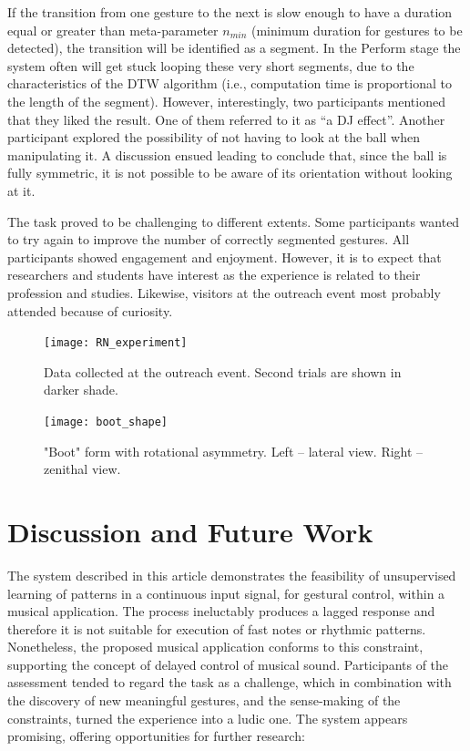 \documentclass{nime-alternate_ADJ} %
\begin{document}
If the transition from one gesture to the next is slow enough to have a duration equal or greater than meta-parameter $n_{min}$ (minimum duration for gestures to be detected), the transition will be identified as a segment. In the Perform stage the system often will get stuck looping these very short segments, due to the characteristics of the DTW algorithm (i.e., computation time is proportional to the length of the segment). However, interestingly, two participants mentioned that they liked the result. One of them referred to it as “a DJ effect”. Another participant explored the possibility of not having to look at the ball when manipulating it. A discussion ensued leading to conclude that, since the ball is fully symmetric, it is not possible to be aware of its orientation without looking at it.

The task proved to be challenging to different extents. Some participants wanted to try again to improve the number of correctly segmented gestures. All participants showed engagement and enjoyment. However, it is to expect that researchers and students have interest as the experience is related to their profession and studies. Likewise, visitors at the outreach event most probably attended because of curiosity.

\begin{figure}[t!]
	\centering
		\texttt{[image: RN\_experiment]}
	\caption{Data collected at the outreach event. Second trials are shown in darker shade.}
	\label{fig_7}
\end{figure}

\begin{figure}[t!]
	\centering
		\texttt{[image: boot\_shape]}
	\caption{"Boot" form with rotational asymmetry. Left -- lateral view. Right -- zenithal view.}
	\label{fig_8}
\end{figure}

\section{Discussion and Future Work}

The system described in this article demonstrates the feasibility of unsupervised learning of patterns in a continuous input signal, for gestural control, within a musical application. The process ineluctably produces a lagged response and therefore it is not suitable for execution of fast notes or rhythmic patterns. Nonetheless, the proposed musical application conforms to this constraint, supporting the concept of delayed control of musical sound. Participants of the assessment tended to regard the task as a challenge, which in combination with the discovery of new meaningful gestures, and the sense-making of the constraints, turned the experience into a ludic one. The system appears promising, offering opportunities for further research:
\end{document}
